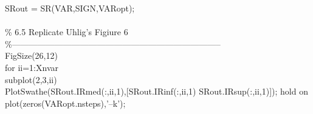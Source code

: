 \hspace{1mm}\hspace{5mm} \hspace{5mm} \hspace{5mm} SRout = SR(VAR,SIGN,VARopt); \\ 
\hspace{1mm}\hspace{5mm} \hspace{5mm} \hspace{5mm}  \\ 
\hspace{1mm}\hspace{5mm} \hspace{5mm} \hspace{5mm} \textcolor{matlabgreen}{\% 6.5 Replicate Uhlig's Figiure 6 }\\ 
\hspace{1mm}\hspace{5mm} \hspace{5mm} \hspace{5mm} \textcolor{matlabgreen}{\%--------------------------------------------------------------------------  }\\ 
\hspace{1mm}\hspace{5mm} \hspace{5mm} \hspace{5mm} FigSize(26,12) \\ 
\hspace{1mm}\hspace{5mm} \hspace{5mm} \hspace{5mm} \textcolor{matlabblue}{for} ii=1:Xnvar \\ 
\hspace{1mm}\hspace{5mm} \hspace{5mm} \hspace{5mm} \hspace{5mm} subplot(2,3,ii) \\ 
\hspace{1mm}\hspace{5mm} \hspace{5mm} \hspace{5mm} \hspace{5mm} PlotSwathe(SRout.IRmed(:,ii,1),[SRout.IRinf(:,ii,1) SRout.IRsup(:,ii,1)]); hold on \\ 
\hspace{1mm}\hspace{5mm} \hspace{5mm} \hspace{5mm} \hspace{5mm} plot(zeros(VARopt.nsteps),\textcolor{matlabpurple}{'--k'}); \\ 
